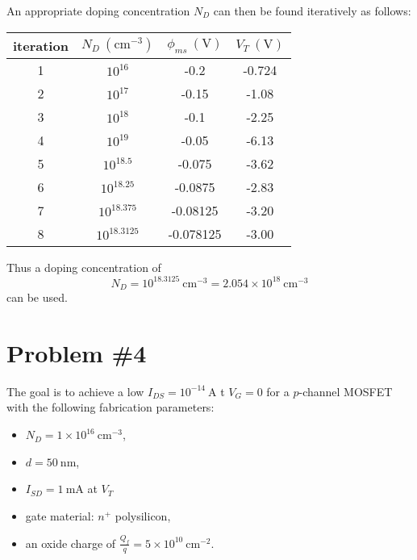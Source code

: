 \documentclass{article}
\begin{document}
An appropriate doping concentration $N_D$ can then be found iteratively as
follows:

\begin{tabular}{c | c c c }
iteration & $N_D ~(\mathrm{cm}^{-3})$ & $\phi_{ms} ~(\mathrm{V})$ & $V_T ~(\mathrm{V})$ \\
\hline
1         & $10^{16}$                 & -0.2                      & -0.724 \\
2         & $10^{17}$                 & -0.15                     & -1.08  \\
3         & $10^{18}$                 & -0.1                      & -2.25  \\
4         & $10^{19}$                 & -0.05                     & -6.13  \\
5         & $10^{18.5}$               & -0.075                    & -3.62  \\
6         & $10^{18.25}$              & -0.0875                   & -2.83  \\
7         & $10^{18.375}$             & -0.08125                  & -3.20  \\
8         & $10^{18.3125}$            & -0.078125                 & -3.00 
\end{tabular}

Thus a doping concentration of 
$$
N_D = 10^{18.3125} ~\mathrm{cm}^{-3} = 2.054 \times 10^{18} ~\mathrm{cm}^{-3}
$$
can be used.

\pagebreak

\section*{Problem \#4}
The goal is to achieve a low $I_{DS} = 10^{-14} ~\mathrm{A}$ t $V_G = 0$ 
for a $p$-channel MOSFET with the following fabrication parameters:
\begin{itemize}
  \item{$N_D = 1 \times 10^{16} ~\mathrm{cm}^{-3}$,}
  \item{$d = 50 ~\mathrm{nm}$,}
  \item{$I_{SD} = 1 ~\mathrm{mA}$ at $V_T$}
  \item{gate material: $n^+$ polysilicon,}
  \item{an oxide charge of $\frac{Q_f}{q} = 5 \times 10^{10} ~\mathrm{cm}^{-2}$.}
\end{itemize}
\end{document}
